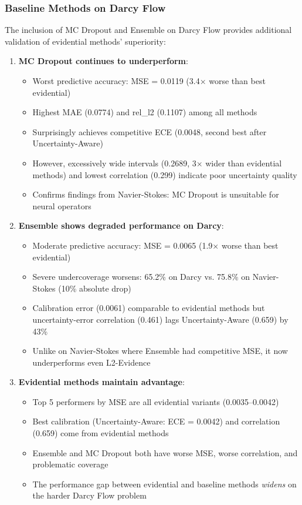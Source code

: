 \subsubsection{Baseline Methods on Darcy Flow}

The inclusion of MC Dropout and Ensemble on Darcy Flow provides additional validation of evidential methods' superiority:

\begin{enumerate}
\item \textbf{MC Dropout continues to underperform}:
\begin{itemize}
\item Worst predictive accuracy: MSE = 0.0119 (3.4× worse than best evidential)
\item Highest MAE (0.0774) and rel\_l2 (0.1107) among all methods
\item Surprisingly achieves competitive ECE (0.0048, second best after Uncertainty-Aware)
\item However, excessively wide intervals (0.2689, 3× wider than evidential methods) and lowest correlation (0.299) indicate poor uncertainty quality
\item Confirms findings from Navier-Stokes: MC Dropout is unsuitable for neural operators
\end{itemize}

\item \textbf{Ensemble shows degraded performance on Darcy}:
\begin{itemize}
\item Moderate predictive accuracy: MSE = 0.0065 (1.9× worse than best evidential)
\item Severe undercoverage worsens: 65.2\% on Darcy vs. 75.8\% on Navier-Stokes (10\% absolute drop)
\item Calibration error (0.0061) comparable to evidential methods but uncertainty-error correlation (0.461) lags Uncertainty-Aware (0.659) by 43\%
\item Unlike on Navier-Stokes where Ensemble had competitive MSE, it now underperforms even L2-Evidence
\end{itemize}

\item \textbf{Evidential methods maintain advantage}:
\begin{itemize}
\item Top 5 performers by MSE are all evidential variants (0.0035--0.0042)
\item Best calibration (Uncertainty-Aware: ECE = 0.0042) and correlation (0.659) come from evidential methods
\item Ensemble and MC Dropout both have worse MSE, worse correlation, and problematic coverage
\item The performance gap between evidential and baseline methods \textit{widens} on the harder Darcy Flow problem
\end{itemize}
\end{enumerate}

